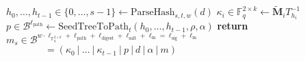 \begin{algorithm}[H]
\begin{algorithmic}[1]
\State $h_0, \ldots, h_{t-1} \in \{0, \ldots, s-1\} \gets \text{ParseHash}_{s,t,w}(d)$
        \State $\kappa_i \in \mathds{F}_q^{2 \times k} \gets \tilde{\textbf{M}}_i T_{h_i}^{-1}$
    \EndIf
\EndFor
\State $p \in \mathcal{B}^{\ell_\text{path}} \gets \text{SeedTreeToPath}_t(h_0, \ldots, h_{t-1}, \rho, \alpha)$
\State \textbf{return} $m_s \in \mathcal{B}^{w \cdot \ell_{\mathds{F}_q^{2 \times k}} + \ell_\text{path} + \ell_\text{digest} + \ell_\text{salt} + \ell_\text{m} = \ell_\text{sig} + \ell_\text{m}}$\\
$\quad\quad\quad\quad= (\kappa_0~|~\ldots~|~\kappa_{t-1}~|~p~|~d~|~\alpha~|~m)$
\end{algorithmic}
\end{algorithm}